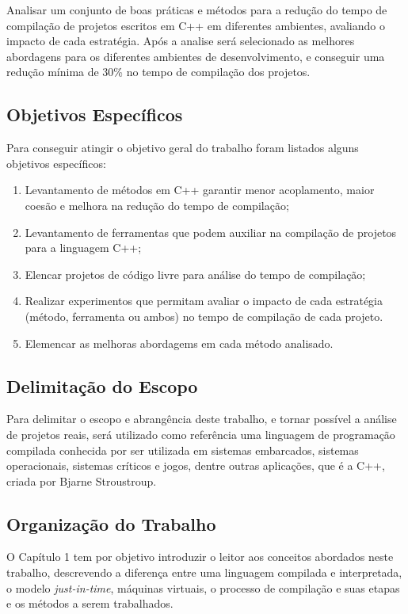 Analisar um conjunto de boas práticas e métodos para a redução do
 tempo de compilação de projetos escritos em C++ em diferentes ambientes,
 avaliando o impacto de cada estratégia.
 Após a analise será selecionado as melhores abordagens
 para os diferentes ambientes de desenvolvimento, e conseguir uma
 redução mínima de 30\% no tempo de compilação dos projetos.

\subsection*{Objetivos Específicos}

Para conseguir atingir o objetivo geral do trabalho foram listados
 alguns objetivos específicos:


\begin{enumerate}
    \item Levantamento de  métodos em C++ garantir menor acoplamento,
 maior coesão e melhora na redução do tempo de compilação;
    \item Levantamento de ferramentas que podem auxiliar na compilação
 de projetos para a linguagem C++;
    \item Elencar projetos de código livre para análise do tempo de
 compilação;
    \item Realizar experimentos que permitam avaliar o impacto de cada
 estratégia (método, ferramenta ou ambos) no tempo de compilação de
 cada projeto.
    \item Elemencar as melhoras abordagems em cada método analisado.
\end{enumerate}


\subsection*{Delimitação do Escopo}

Para delimitar o escopo e abrangência deste trabalho, e tornar possível
 a análise de projetos reais, será utilizado como referência uma linguagem
 de programação compilada conhecida por ser utilizada em sistemas embarcados,
 sistemas operacionais, sistemas críticos e jogos, dentre outras aplicações,
 que é a C++, criada por Bjarne Stroustroup\cite{BjarneC++}.

\subsection*{Organização do Trabalho}

O Capítulo 1 tem por objetivo introduzir o leitor aos conceitos abordados
 neste trabalho, descrevendo a diferença entre uma linguagem compilada e
 interpretada, o modelo \textit{just-in-time}, máquinas virtuais, o processo de compilação
 e suas etapas e os métodos a serem trabalhados.

